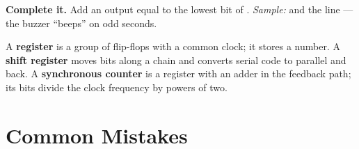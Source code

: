 \textbf{Complete it.} Add an output  equal to the lowest bit of
. \emph{Sample:}  and the line
---the buzzer ``beeps'' on odd seconds.

\begin{ideabox}
A \textbf{register} is a group of flip-flops with a common clock; it stores a number.
A \textbf{shift register} moves bits along a chain and converts
serial code to parallel and back. A \textbf{synchronous counter}
is a register with an adder in the feedback path; its bits divide the clock frequency
by powers of two.
\end{ideabox}

\section{Common Mistakes}

